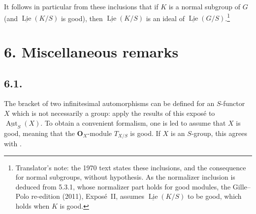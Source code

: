 It follows in particular from these inclusions that if \(K\) is a normal
subgroup of \(G\) (and \(\underline{\operatorname{Lie}}(K/S)\) is good),
then \(\underline{\operatorname{Lie}}(K/S)\) is an ideal of
\(\underline{\operatorname{Lie}}(G/S)\).\footnote{Translator's note: the 1970
text states these inclusions, and the consequence for normal subgroups,
without hypothesis. As the normalizer inclusion is deduced from 5.3.1,
whose normalizer part holds for good modules, the Gille--Polo re-edition
(2011), Expos\'e~II, assumes \(\underline{\operatorname{Lie}}(K/S)\) to be
good, which holds when \(K\) is good.}

\section*{6. Miscellaneous remarks}

\subsection*{6.1.}
The bracket of two infinitesimal automorphisms can be defined for an
\(S\)-functor \(X\) which is not necessarily a group: apply the
results of this expos\'e to \(\underline{\operatorname{Aut}}_S(X)\).
To obtain a convenient formalism, one is led to assume that \(X\) is
good, meaning that the \(\mathbf O_X\)-module \(T_{X/S}\) is good. If
\(X\) is an \(S\)-group, this agrees with .

